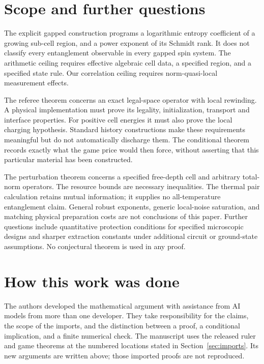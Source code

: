 \section{Scope and further questions}\label{sec:scope}
The explicit gapped construction programs a logarithmic entropy
coefficient of a growing sub-cell region, and a power exponent of its
Schmidt rank. It does not classify every entanglement observable in
every gapped spin system. The arithmetic ceiling requires effective
algebraic cell data, a specified region, and a specified state rule.
Our correlation ceiling requires norm-quasi-local measurement effects.

The referee theorem concerns an exact legal-space operator with local
rewinding. A physical implementation must prove its legality,
initialization, transport and interface properties. For positive cell
energies it must also prove the local charging hypothesis. Standard
history constructions make these requirements meaningful but do not
automatically discharge them. The conditional theorem records exactly
what the game price would then force, without asserting that this
particular material has been constructed.

The perturbation theorem concerns a specified free-depth cell and
arbitrary total-norm operators. The resource bounds are necessary
inequalities. The thermal pair calculation retains mutual information;
it supplies no all-temperature entanglement claim. General robust
exponents, generic local-noise saturation, and matching physical
preparation costs are not conclusions of this paper. Further questions
include quantitative protection conditions for specified microscopic
designs and sharper extraction constants under additional circuit or
ground-state assumptions. No conjectural theorem is used in any proof.

\section{How this work was done}\label{sec:methods}
The authors developed the mathematical argument with assistance from
AI models from more than one developer. They take responsibility for
the claims, the scope of the imports, and the distinction between a
proof, a conditional implication, and a finite numerical check.
The manuscript uses the released ruler and game theorems at the
numbered locations stated in Section~\ref{sec:imports}. Its new
arguments are written above; those imported proofs are not reproduced.

